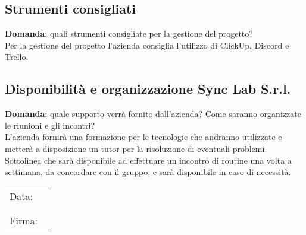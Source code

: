 \documentclass[italian,12pt]{article} %
\begin{document}
\begin{flushleft}
\subsection{Strumenti consigliati}
	\textbf{Domanda}: quali strumenti consigliate per la gestione del progetto?\\
	Per la gestione del progetto l'azienda consiglia l'utilizzo di ClickUp, Discord e Trello.

\subsection{Disponibilità e organizzazione Sync Lab S.r.l.}
	\textbf{Domanda}: quale supporto verrà fornito dall'azienda? Come saranno organizzate le riunioni e gli incontri?\\
	L'azienda fornirà una formazione per le tecnologie che andranno utilizzate e metterà a disposizione un tutor per la risoluzione di eventuali problemi. Sottolinea che sarà disponibile ad effettuare un incontro di routine una volta a settimana, da concordare con il gruppo, e sarà disponibile in caso di necessità. 

\end{flushleft}

\begin{table}[b]
	\begin{tabular}{@{}p{.5in}p{4in}@{}}
		Data:  & \hrulefill \\
			   &     		\\
			   &     		\\
		Firma: & \hrulefill \\
	\end{tabular}
	\end{table}
\end{document}
